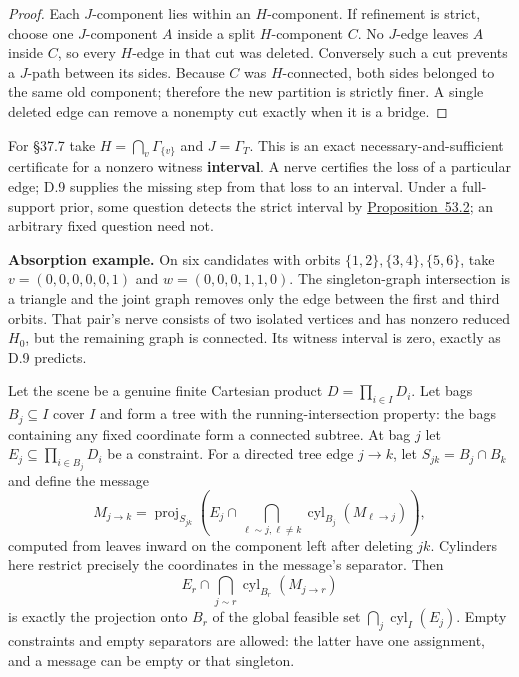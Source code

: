 \begin{proof}

Each \(J\)-component lies within an \(H\)-component. If refinement is strict, choose one \(J\)-component \(A\) inside a split \(H\)-component \(C\). No \(J\)-edge leaves \(A\) inside \(C\), so every \(H\)-edge in that cut was deleted. Conversely such a cut prevents a \(J\)-path between its sides. Because \(C\) was \(H\)-connected, both sides belonged to the same old component; therefore the new partition is strictly finer. A single deleted edge can remove a nonempty cut exactly when it is a bridge.
\end{proof}

For §37.7 take \(H=\bigcap_v\Gamma_{\{v\}}\) and \(J=\Gamma_T\). This is an exact necessary-and-sufficient certificate for a nonzero witness \textbf{interval}. A nerve certifies the loss of a particular edge; D.9 supplies the missing step from that loss to an interval. Under a full-support prior, some question detects the strict interval by \hyperlink{stmt:53.2}{Proposition~53.2}; an arbitrary fixed question need not.

\textbf{Absorption example.} On six candidates with orbits \(\{1,2\},\{3,4\},\{5,6\}\), take \(v=(0,0,0,0,0,1)\) and \(w=(0,0,0,1,1,0)\). The singleton-graph intersection is a triangle and the joint graph removes only the edge between the first and third orbits. That pair's nerve consists of two isolated vertices and has nonzero reduced \(H_0\), but the remaining graph is connected. Its witness interval is zero, exactly as D.9 predicts.


\begin{thmplain}

Let the scene be a genuine finite Cartesian product \(D=\prod_{i\in I}D_i\). Let bags \(B_j\subseteq I\) cover \(I\) and form a tree with the running-intersection property: the bags containing any fixed coordinate form a connected subtree. At bag \(j\) let \(E_j\subseteq\prod_{i\in B_j}D_i\) be a constraint. For a directed tree edge \(j\to k\), let \(S_{jk}=B_j\cap B_k\) and define the message
\[M_{j\to k}=\operatorname{proj}_{S_{jk}}\left(E_j\cap\bigcap_{\ell\sim j,\ell\ne k}\operatorname{cyl}_{B_j}(M_{\ell\to j})\right),\]
computed from leaves inward on the component left after deleting \(jk\). Cylinders here restrict precisely the coordinates in the message's separator. Then
\[E_r\cap\bigcap_{j\sim r}\operatorname{cyl}_{B_r}(M_{j\to r})\]
is exactly the projection onto \(B_r\) of the global feasible set \(\bigcap_j\operatorname{cyl}_{I}(E_j)\). Empty constraints and empty separators are allowed: the latter have one assignment, and a message can be empty or that singleton.
\end{thmplain}


